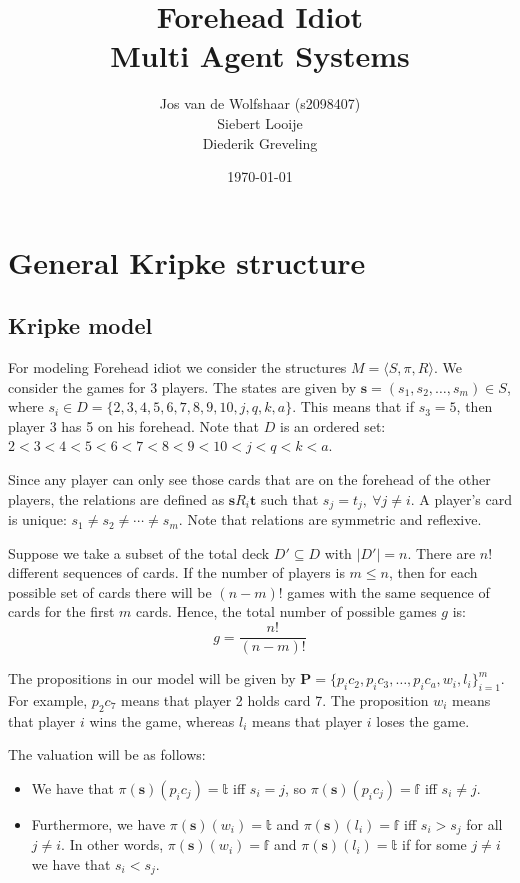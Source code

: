\documentclass[a4paper,10pt]{article}
\title{Forehead Idiot\\ {\Large Multi Agent Systems}}
\author{Jos van de Wolfshaar (s2098407)\\
Siebert Looije\\
Diederik Greveling}
\date{\today}
\begin{document}
\maketitle
\section{General Kripke structure}
\subsection{Kripke model}
For modeling Forehead idiot we consider the structures $M = \langle S, \pi, R \rangle$. We consider the games for 3 players. The states are given by $\boldsymbol s = (s_1,s_2,\ldots,s_m) \in S$, where $s_i \in D = \{ 2,3,4,5,6,7,8,9,10,j,q,k,a \}$. This means that if $s_3 = 5$, then player 3 has 5 on his forehead. Note that $D$ is an ordered set:
$2<3<4<5<6<7<8<9<10<j<q<k<a$.

Since any player can only see those cards that are on the forehead of the other players, the relations are defined as $\boldsymbol s R_i \boldsymbol t$ such that $s_j = t_j,~\forall j \neq i$. A player's card is unique: $s_1 \neq s_2 \neq \cdots \neq s_m$. Note that relations are symmetric and reflexive.

Suppose we take a subset of the total deck $D'\subseteq D$ with $|D'|=n$. There are $n!$ different sequences of cards. If the number of players is $m\leq n$, then for each possible set of cards there will be $(n-m)!$ games with the same sequence of cards for the first $m$ cards. Hence, the total number of possible games $g$ is:
\begin{equation}
 g=\frac{n!}{(n-m)!}
\end{equation}

The propositions in our model will be given by $\boldsymbol P = \{ p_ic_2,p_ic_3,\ldots,p_ic_a,w_i,l_i\}_{i=1}^m$. For example, $p_2 c_7$ means that player 2 holds card 7. The proposition $w_i$ means that player $i$ wins the game, whereas $l_i$ means that player $i$ loses the game.

The valuation will be as follows:
\begin{itemize}
 \item We have that $\pi(\boldsymbol s)(p_ic_j) = \mathbb{t}$ iff $s_i = j$, so $\pi(\boldsymbol s)(p_ic_j) = \mathbb{f}$ iff $s_i \neq j$. 
 \item Furthermore, we have $\pi(\boldsymbol s)(w_i) = \mathbb{t}$ and $\pi(\boldsymbol s)(l_i) = \mathbb{f}$ iff $s_i > s_j$ for all $j \neq i$. In other words, $\pi(\boldsymbol s)(w_i)=\mathbb{f}$ and $\pi(\boldsymbol s)(l_i) = \mathbb{t}$ if for some $j\neq i$ we have that $s_i < s_j$. 
\end{itemize}
\end{document}
